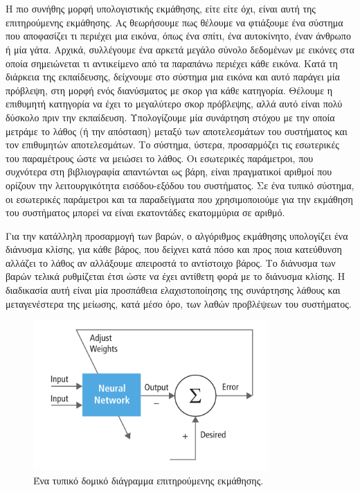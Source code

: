 \section{\cite{LeCun2015}}

Η πιο συνήθης μορφή υπολογιστικής εκμάθησης, είτε  είτε όχι, είναι αυτή της επιτηρούμενης εκμάθησης.
Ας θεωρήσουμε πως θέλουμε να φτιάξουμε ένα σύστημα που αποφασίζει τι περιέχει μια εικόνα, όπως ένα σπίτι, ένα αυτοκίνητο, έναν άνθρωπο ή μία γάτα.
Αρχικά, συλλέγουμε ένα αρκετά μεγάλο σύνολο δεδομένων με εικόνες στα οποία σημειώνεται τι αντικείμενο από τα παραπάνω περιέχει κάθε εικόνα.
Κατά τη διάρκεια της εκπαίδευσης, δείχνουμε στο σύστημα μια εικόνα και αυτό παράγει μία πρόβλεψη, στη μορφή ενός διανύσματος με σκορ για κάθε κατηγορία.
Θέλουμε η επιθυμητή κατηγορία να έχει το μεγαλύτερο σκορ πρόβλεψης, αλλά αυτό είναι πολύ δύσκολο πριν την εκπαίδευση.
Υπολογίζουμε μία συνάρτηση στόχου με την οποία μετράμε το λάθος (ή την απόσταση) μεταξύ των αποτελεσμάτων του συστήματος και τον επιθυμητών αποτελεσμάτων.
Το σύστημα, ύστερα, προσαρμόζει τις εσωτερικές του παραμέτρους ώστε να μειώσει το λάθος.
Οι εσωτερικές παράμετροι, που συχνότερα στη βιβλιογραφία απαντώνται ως βάρη, είναι πραγματικοί αριθμοί που ορίζουν την λειτουργικότητα εισόδου-εξόδου του συστήματος.
Σε ένα τυπικό  σύστημα, οι εσωτερικές παράμετροι και τα παραδείγματα που χρησιμοποιούμε για την εκμάθηση του συστήματος μπορεί να είναι εκατοντάδες εκατομμύρια σε αριθμό. 

Για την κατάλληλη προσαρμογή των βαρών, ο αλγόριθμος εκμάθησης υπολογίζει ένα διάνυσμα κλίσης, για κάθε βάρος, που δείχνει κατά πόσο και προς ποια κατεύθυνση αλλάζει το λάθος αν αλλάξουμε απειροστά το αντίστοιχο βάρος.
Το διάνυσμα των βαρών τελικά ρυθμίζεται έτσι ώστε να έχει αντίθετη φορά με το διάνυσμα κλίσης.
Η διαδικασία αυτή είναι μία προσπάθεια ελαχιστοποίησης της συνάρτησης λάθους και μεταγενέστερα της μείωσης, κατά μέσο όρο, των λαθών προβλέψεων του συστήματος.

\begin{figure}[tph]
	\includegraphics[width=0.8\textwidth, keepaspectratio]{images/training.png}
	\centering 
	\caption{Ένα τυπικό δομικό διάγραμμα επιτηρούμενης εκμάθησης.}
	\label{fig:training}
\end{figure}

